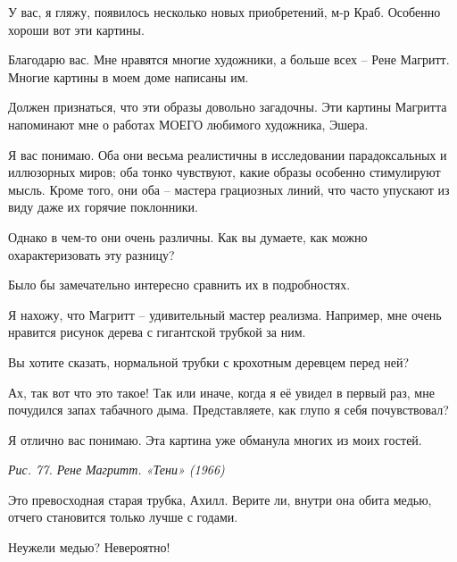 \documentclass[../main.tex]{subfiles}
\begin{document}


\begin{dialogue}

 У вас, я гляжу, появилось несколько новых приобретений, м-р Краб. Особенно хороши вот эти картины.

 Благодарю вас. Мне нравятся многие художники, а больше всех \--- Рене Магритт. Многие картины в моем доме написаны им.

 Должен признаться, что эти образы довольно загадочны. Эти картины Магритта напоминают мне о работах МОЕГО любимого художника, Эшера.

 Я вас понимаю. Оба они весьма реалистичны в исследовании парадоксальных и иллюзорных миров; оба тонко чувствуют, какие образы особенно стимулируют мысль. Кроме того, они оба \--- мастера грациозных линий, что часто упускают из виду даже их горячие поклонники.

 Однако в чем-то они очень различны. Как вы думаете, как можно охарактеризовать эту разницу?

 Было бы замечательно интересно сравнить их в подробностях.

 Я нахожу, что Магритт \--- удивительный мастер реализма. Например, мне очень нравится рисунок дерева с гигантской трубкой за ним.

 Вы хотите сказать, нормальной трубки с крохотным деревцем перед ней?

 Ах, так вот что это такое! Так или иначе, когда я её увидел в первый раз, мне почудился запах табачного дыма. Представляете, как глупо я себя почувствовал?

 Я отлично вас понимаю. Эта картина уже обманула многих из моих гостей.

\emph{Рис. 77. Рене Магритт. «Тени» (1966)}


Это превосходная старая трубка, Ахилл. Верите ли, внутри она обита медью, отчего становится только лучше с годами.

 Неужели медью? Невероятно!


\end{dialogue}
\end{document}

